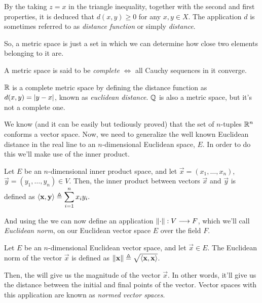 \begin{remark}
By the taking $z = x$ in the triangle inequality, together with the second and first properties, it is deduced that $d(x, y)\geq 0$
for any $x, y\in X$. The application $d$ is sometimes referred to as \textit{distance function} or simply \textit{distance}.
\end{remark}

So, a metric space is just a set in which we can determine how close two elements belonging to it are.

\begin{defn}
    A metric space is said to be \textit{complete} $\iff$ all Cauchy sequences in it converge.
\end{defn}

\begin{example}
    $\R$ is a complete metric space by defining the distance function as $d(x, y) = \abs{y - x}$, known as 
    \textit{euclidean distance}. $\Q$ is also a metric space, but it's not a complete one.
\end{example}
\newpage
We know (and it can be easily but tediously proved) that the set of $n$-tuples $\Rtn$ conforms a vector space. Now, we need
to generalize the well known Euclidean distance in the real line to an $n$-dimensional Euclidean space, $E$. In order to do 
this we'll make use of the inner product.

\begin{defn}\label{def:inner-product}
    Let $E$ be an $n$-dimensional inner product space, and let $\vec{x} = (x_1, \ldots, x_n)$, $\vec{y} = (y_1, \ldots, y_n)
    \in V$. Then, the inner product between vectors $\vec{x}$ and $\vec{y}$ is defined as 
    $\langle \mathbf{x}, \mathbf{y} \rangle\triangleq\displaystyle\sum_{i=1}^n x_iy_i.$
\end{defn}

\noindent And using the  we can now define an application $\left\Vert \cdot \right\Vert : V\longrightarrow F$, which
we'll call \textit{Euclidean norm}, on our Euclidean vector space $E$ over the field $F$. 

\begin{defn}\label{def:euclidean-norm}
    Let $E$ be an $n$-dimensional Euclidean vector space, and let $\vec{x}\in E$. The Euclidean norm of the vector $\vec{x}$
    is defined as $\left\Vert \mathbf{x} \right\Vert\triangleq\sqrt{\langle \mathbf{x}, \mathbf{x} \rangle}$.
\end{defn}

\noindent Then, the  will give us the magnitude of the vector $\vec{x}$. In other words, it'll
give us the distance between the initial and final points of the vector. Vector spaces with this application are known
as \textit{normed vector spaces}.

